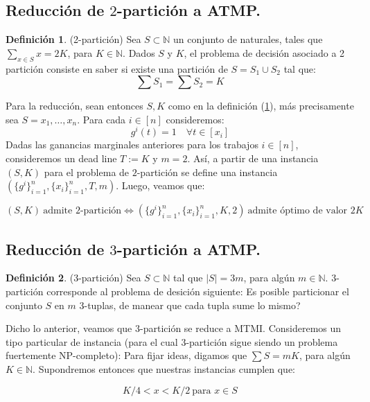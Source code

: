\documentclass[10pt]{article}
\newcommand{\N}{\mathbb N}
\theoremstyle{plain}
\theoremstyle{definition}
\newtheorem{defi}{Definición}
\begin{document}
\subsection{Reducción de $2$-partición a ATMP.}
\begin{defi}(2-partición)
\label{def:2part}
Sea $S \subset \N$ un conjunto de naturales, tales que $\sum_{x \in S} x = 2 K$, para $K \in \N$. Dados $S$ y $K$, el problema de decisión asociado a 2 partición consiste en saber si existe una partición de $S = S_1 \cup S_2$ tal que:
$$
\sum S_1 = \sum S_2 = K
$$
\end{defi}

Para la reducción, sean entonces $S, K$ como en la definición (\ref{def:2part}), más precisamente sea $S = {x_1, \ldots, x_n}$. Para cada $i \in [n]$ consideremos:
\begin{equation}
\label{eq:red}
g^i(t) = 1 \quad \forall t \in [x_i]
\end{equation}
Dadas las ganancias marginales anteriores para los trabajos $i \in [n]$, consideremos un dead line $T:= K$ y $m = 2$. Así, a partir de una instancia $(S, K)$ para el problema de $2$-partición se define una instancia $(\{g^i\}_{i=1}^n,\{x_i\}_{i=1}^n, T, m)$. Luego, veamos que:

\begin{equation}
\label{eq:red2part}
(S, K)\ \text{admite $2$-partición} \Longleftrightarrow (\{g^i\}_{i=1}^n,\{x_i\}_{i=1}^n, K, 2)\  \text{admite óptimo de valor } 2K
\end{equation}


\subsection{Reducción de $3$-partición a ATMP.}
\begin{defi}{(3-partición)}
Sea $S\subset \N$ tal que $|S| = 3m$, para algún $m \in \N$. $3$-partición corresponde al problema de desición siguiente: Es posible particionar el conjunto $S$ en $m$ $3$-tuplas, de manear que cada tupla sume lo mismo?
\end{defi}

Dicho lo anterior, veamos que $3$-partición se reduce a MTMI. Consideremos un tipo particular de instancia (para el cual $3$-partición sigue siendo un problema fuertemente NP-completo): Para fijar ideas, digamos que $\sum S = m K$, para algún $K \in \N$. Supondremos entonces que nuestras instancias cumplen que:

\begin{equation}
\label{eq:inst}
K/4 < x < K/2\  \text{para } x \in S
\end{equation}
\end{document}
